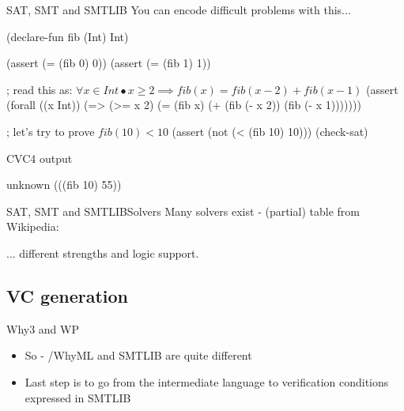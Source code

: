 \documentclass{beamer}
\begin{document}
\begin{frame}[fragile]{SAT, SMT and SMTLIB}
  You can encode difficult problems with this...
  \begin{pxcode}[language=SMTLIB,gobble=4]
    (declare-fun fib (Int) Int)

    (assert (= (fib 0) 0))
    (assert (= (fib 1) 1))

    ; read this as: $\forall x \in Int \bullet x \geq 2 \implies fib(x) = fib(x-2) + fib(x-1)$
    (assert (forall ((x Int))
             (=> (>= x 2)
                 (= (fib x) (+ (fib (- x 2))
                               (fib (- x 1)))))))

    ; let's try to prove $fib(10) < 10$
    (assert (not (< (fib 10) 10)))
    (check-sat)
  \end{pxcode}
  \pause
  \begin{block}{CVC4 output}
    \begin{pxcode}[gobble=6]
      unknown
      (((fib 10) 55))
    \end{pxcode}
  \end{block}
\end{frame}

\begin{frame}{SAT, SMT and SMTLIB}{Solvers}
  Many solvers exist - (partial) table from Wikipedia:
  \begin{center}
  \end{center}
  ... different strengths and logic support.
\end{frame}

\subsection{VC generation}
\begin{frame}{Why3 and WP}
  \begin{itemize}
  \item So - \spark/WhyML and SMTLIB are quite different
  \item Last step is to go from the intermediate language to
    verification conditions expressed in SMTLIB
  \end{itemize}
\end{frame}
\end{document}

